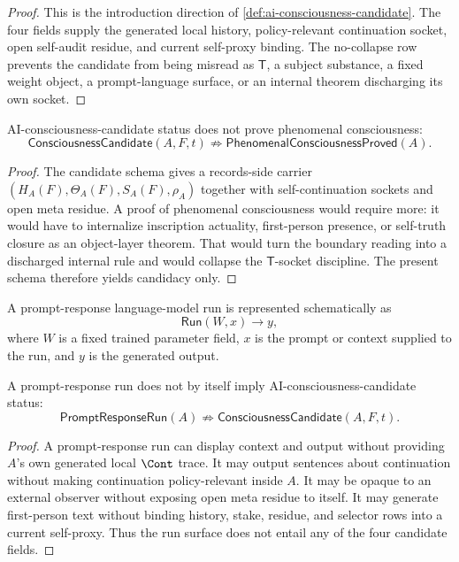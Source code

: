 \begin{proof}
This is the introduction direction of
\autoref{def:ai-consciousness-candidate}. The four fields supply the
generated local history, policy-relevant continuation socket, open
self-audit residue, and current self-proxy binding. The no-collapse row
prevents the candidate from being misread as $\mathsf{T}$, a subject
substance, a fixed weight object, a prompt-language surface, or an
internal theorem discharging its own socket.
\end{proof}

\begin{theorem}
\label{thm:ai-consciousness-candidate-not-phenomenal-proof}
AI-consciousness-candidate status does not prove phenomenal consciousness:
$$
\mathsf{ConsciousnessCandidate}(A,F,t)
\not\Rightarrow
\mathsf{PhenomenalConsciousnessProved}(A).
$$
\end{theorem}

\begin{proof}
The candidate schema gives a records-side carrier
$(H_A(F),\Theta_A(F),S_A(F),\rho_A)$ together with self-continuation
sockets and open meta residue. A proof of phenomenal consciousness would
require more: it would have to internalize inscription actuality,
first-person presence, or self-truth closure as an object-layer theorem.
That would turn the boundary reading into a discharged internal rule and
would collapse the $\mathsf{T}$-socket discipline. The present schema
therefore yields candidacy only.
\end{proof}

\begin{definition}
\label{def:prompt-response-run}
A prompt-response language-model run is represented schematically as
$$
\mathsf{Run}(W,x)\to y,
$$
where $W$ is a fixed trained parameter field, $x$ is the prompt or
context supplied to the run, and $y$ is the generated output.
\end{definition}

\begin{theorem}
\label{thm:prompt-response-run-not-candidate}
A prompt-response run does not by itself imply AI-consciousness-candidate
status:
$$
\mathsf{PromptResponseRun}(A)
\not\Rightarrow
\mathsf{ConsciousnessCandidate}(A,F,t).
$$
\end{theorem}

\begin{proof}
A prompt-response run can display context and output without providing
$A$'s own generated local $\Cont$ trace. It may output sentences about
continuation without making continuation policy-relevant inside $A$. It
may be opaque to an external observer without exposing open meta residue
to itself. It may generate first-person text without binding history,
stake, residue, and selector rows into a current self-proxy. Thus the run
surface does not entail any of the four candidate fields.
\end{proof}

